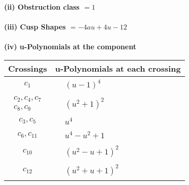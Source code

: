 \documentclass[1p]{elsarticle_modified}
\theoremstyle{definition}
\begin{document}
\flushleft \textbf{(ii) Obstruction class $= 1$}\\~\\
\flushleft \textbf{(iii) Cusp Shapes $= -4 a u+4 u-12$}\\~\\
\newpage\renewcommand{\arraystretch}{1}
\flushleft \textbf{(iv) u-Polynomials at the component}\newline \\
\begin{tabular}{m{50pt}|m{274pt}}
Crossings & \hspace{64pt}u-Polynomials at each crossing \\
\hline $$\begin{aligned}c_{1}\end{aligned}$$&$\begin{aligned}
&(u-1)^4
\end{aligned}$\\
\hline $$\begin{aligned}c_{2},c_{4},c_{7}\\c_{8},c_{9}\end{aligned}$$&$\begin{aligned}
&(u^2+1)^2
\end{aligned}$\\
\hline $$\begin{aligned}c_{3},c_{5}\end{aligned}$$&$\begin{aligned}
&u^4
\end{aligned}$\\
\hline $$\begin{aligned}c_{6},c_{11}\end{aligned}$$&$\begin{aligned}
&u^4- u^2+1
\end{aligned}$\\
\hline $$\begin{aligned}c_{10}\end{aligned}$$&$\begin{aligned}
&(u^2- u+1)^2
\end{aligned}$\\
\hline $$\begin{aligned}c_{12}\end{aligned}$$&$\begin{aligned}
&(u^2+u+1)^2
\end{aligned}$\\
\hline
\end{tabular}\\~\\
\end{document}
